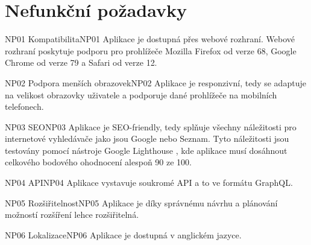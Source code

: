 \section{Nefunkční požadavky}
\label{sc:non_func_req}

\begin{requirment}{NP01 Kompatibilita}{NP01}
    Aplikace je dostupná přes webové rozhraní. Webové rozhraní poskytuje podporu pro prohlížeče Mozilla Firefox od verze 68, Google Chrome od verze 79 a Safari od verze 12.
\end{requirment}

\begin{requirment}{NP02 Podpora menších obrazovek}{NP02}
    Aplikace je responzivní, tedy se adaptuje na velikost obrazovky uživatele a podporuje dané prohlížeče na mobilních telefonech.
\end{requirment}

\begin{requirment}{NP03 SEO}{NP03}
    Aplikace je SEO-friendly, tedy splňuje všechny náležitosti pro internetové vyhledávače jako jsou Google nebo Seznam. Tyto náležitosti jsou testovány pomocí nástroje Google Lighthouse \cite{googlellc_2019_lighthouse}, kde aplikace musí dosáhnout celkového bodového ohodnocení alespoň 90 ze 100.
\end{requirment}

\begin{requirment}{NP04 API}{NP04}
    Aplikace vystavuje soukromé API a to ve formátu GraphQL.
\end{requirment}

\begin{requirment}{NP05 Rozšiřitelnost}{NP05}
    Aplikace je díky správnému návrhu a plánování možností rozšíření lehce rozšiřitelná.
\end{requirment}

\begin{requirment}{NP06 Lokalizace}{NP06}
    Aplikace je dostupná v anglickém jazyce.
\end{requirment}

